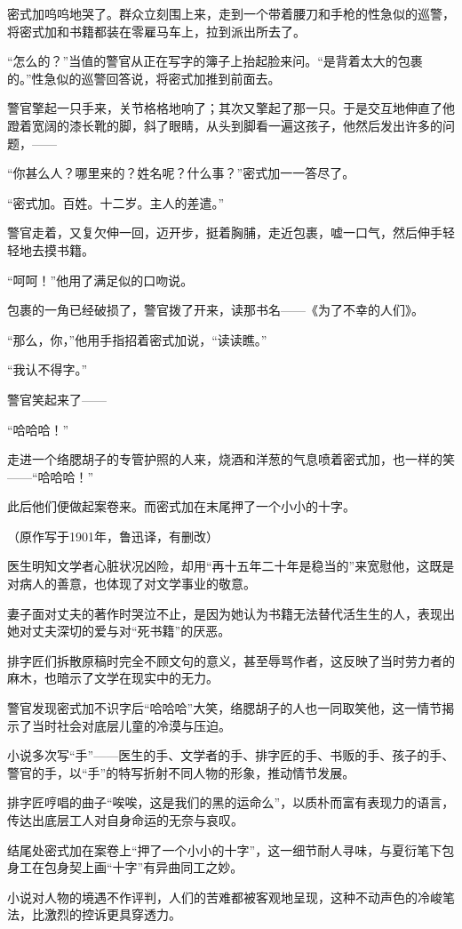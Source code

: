 \documentclass[11pt,a4paper]{ctexart}
\begin{document}
\begin{materialtext}
密式加呜呜地哭了。群众立刻围上来，走到一个带着腰刀和手枪的性急似的巡警，将密式加和书籍都装在零雇马车上，拉到派出所去了。

“怎么的？”当值的警官从正在写字的簿子上抬起脸来问。“是背着太大的包裹的。”性急似的巡警回答说，将密式加推到前面去。

警官擎起一只手来，关节格格地响了；其次又擎起了那一只。于是交互地伸直了他蹬着宽阔的漆长靴的脚，斜了眼睛，从头到脚看一遍这孩子，他然后发出许多的问题，——

“你甚么人？哪里来的？姓名呢？什么事？”密式加一一答尽了。

“密式加。百姓。十二岁。主人的差遣。”

警官走着，又复欠伸一回，迈开步，挺着胸脯，走近包裹，嘘一口气，然后伸手轻轻地去摸书籍。

“呵呵！”他用了满足似的口吻说。

包裹的一角已经破损了，警官拨了开来，读那书名——《为了不幸的人们》。

“那么，你，”他用手指招着密式加说，“读读瞧。”

“我认不得字。”

警官笑起来了——

“哈哈哈！”

走进一个络腮胡子的专管护照的人来，烧酒和洋葱的气息喷着密式加，也一样的笑——“哈哈哈！”

此后他们便做起案卷来。而密式加在末尾押了一个小小的十字。
\end{materialtext}
\begin{flushright}（原作写于1901年，鲁迅译，有删改）\end{flushright}

\begin{choices}
\item 医生明知文学者心脏状况凶险，却用“再十五年二十年是稳当的”来宽慰他，这既是对病人的善意，也体现了对文学事业的敬意。
\item 妻子面对丈夫的著作时哭泣不止，是因为她认为书籍无法替代活生生的人，表现出她对丈夫深切的爱与对“死书籍”的厌恶。
\item 排字匠们拆散原稿时完全不顾文句的意义，甚至辱骂作者，这反映了当时劳力者的麻木，也暗示了文学在现实中的无力。
\item 警官发现密式加不识字后“哈哈哈”大笑，络腮胡子的人也一同取笑他，这一情节揭示了当时社会对底层儿童的冷漠与压迫。
\end{choices}

\begin{choices}
\item 小说多次写“手”——医生的手、文学者的手、排字匠的手、书贩的手、孩子的手、警官的手，以“手”的特写折射不同人物的形象，推动情节发展。
\item 排字匠哼唱的曲子“唉唉，这是我们的黑的运命么”，以质朴而富有表现力的语言，传达出底层工人对自身命运的无奈与哀叹。
\item 结尾处密式加在案卷上“押了一个小小的十字”，这一细节耐人寻味，与夏衍笔下包身工在包身契上画“十字”有异曲同工之妙。
\item 小说对人物的境遇不作评判，人们的苦难都被客观地呈现，这种不动声色的冷峻笔法，比激烈的控诉更具穿透力。
\end{choices}
\end{document}
